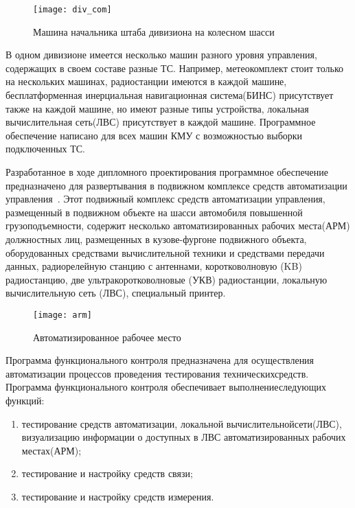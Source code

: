 \begin{figure}[ht]
	\centering
	\texttt{[image: div\_com]}
	\caption{Машина начальника штаба дивизиона на колесном шасси~\cite{div_car}}
	\label{fig:lit_reiview:analytics:div_com}
\end{figure}
В одном дивизионе имеется несколько машин разного уровня управления, содержащих в своем составе разные ТС.
Например, метеокомплект стоит только на нескольких машинах, радиостанции имеются в каждой машине, бесплатформенная
инерциальная навигационная система(БИНС) присутствует также на каждой машине, но имеют разные типы устройства, локальная
вычислительная сеть(ЛВС) присутствует в каждой машине.\break\break
Программное обеспечение написано для всех машин КМУ с возможностью выборки подключенных ТС.

Разработанное в ходе дипломного проектирования программное обеспечение предназначено для развертывания в подвижном
комплексе средств автоматизации управления~\cite{patent_2263960}.
Этот подвижный комплекс средств автоматизации управления, размещенный в подвижном объекте на шасси автомобиля повышенной
грузоподъемности, содержит несколько автоматизированных рабочих места(АРМ) должностных лиц, размещенных в кузове-фургоне
подвижного объекта, оборудованных средствами вычислительной техники и средствами передачи данных, радиорелейную станцию
с антеннами, коротковолновую (KB) радиостанцию, две ультракоротковолновые (УКВ) радиостанции, локальную вычислительную
сеть (ЛВС), специальный принтер.

\begin{figure}[ht]
	\centering
	\texttt{[image: arm]}
	\caption{Автоматизированное рабочее место~\cite{patent_2263960}}
	\label{fig:lit_reiview:analytics:arm}
\end{figure}

Программа функционального контроля предназначена для осуществления автоматизации процессов проведения тестирования
технических\break средств.
Программа функционального контроля обеспечивает выполнение\break следующих функций:
\begin{enumerate}
\item тестирование средств автоматизации, локальной вычислительной\break сети(ЛВС), визуализацию информации о доступных в ЛВС автоматизированных рабочих местах(АРМ);
\item тестирование и настройку средств связи;
\item тестирование и настройку средств измерения.
\end{enumerate}

